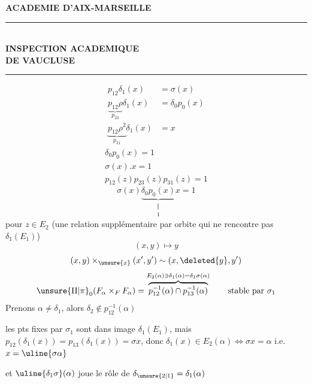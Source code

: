 
\textbf{ACADEMIE D'AIX-MARSEILLE}\\
\rule{3cm}{.4pt}\\
\textbf{INSPECTION ACADEMIQUE}\\
\textbf{DE VAUCLUSE}\\
\rule{1cm}{.4pt}
\[\begin{aligned}
p_{12}\delta_1(x)&=\sigma(x)\\
\underbrace{p_{12}\rho}_{p_{23}}\delta_1(x)&=\delta_0p_0(x)\\
\underbrace{p_{12}\rho^2}_{p_{31}}\delta_1(x)&=x
\end{aligned}\]
\[\boxed{\begin{gathered}
\delta_0p_0(x)=1\\
\sigma(x).x=1\\[.5em]
p_{12}(z)p_{23}(z)p_{31}(z)=1
\end{gathered}}\]
\[\sigma(x)\underbrace{\delta_0p_0(x)}_{\substack{\Vert\\1}}x=1\]
pour $z\in E_2$ (une relation  supplémentaire par orbite  qui ne rencontre pas $\delta_1(E_1)$)
\[(x,y)\mapsto y\]
\[(x,y)\times_{\unsure{x}}(x',y')\sim(x,\deleted{y},y')\]
\[\unsure{\Pi|\pi}_0(F_\alpha\times_F F_\alpha)=\overbrace{p_{12}^{-1}(\alpha)\cap p_{13}^{-1}(\alpha)}^{E_2(\alpha)\ni\delta_1(\alpha)=\delta_1\sigma(\alpha)}\qquad\text{stable par }\sigma_1\]
Prenons $\alpha\ne\delta_1$, alors $\delta_2\notin p_{12}^{-1}(\alpha)$

les pts fixes par $\sigma_1$ sont dans image $\delta_1(E_1)$, mais $p_{12}(\delta_1(x))=p_{13}(\delta_1(x))=\sigma x$, donc 
 $\delta_1(x)\in E_2(\alpha)\Longleftrightarrow\sigma x=\alpha$ i.e. $x=\uline{\sigma\alpha}$

et $\uline{\delta_1\sigma}(\alpha)$ joue le rôle de $\delta_{\unsure{2|1}}=\delta_1(\alpha)$
